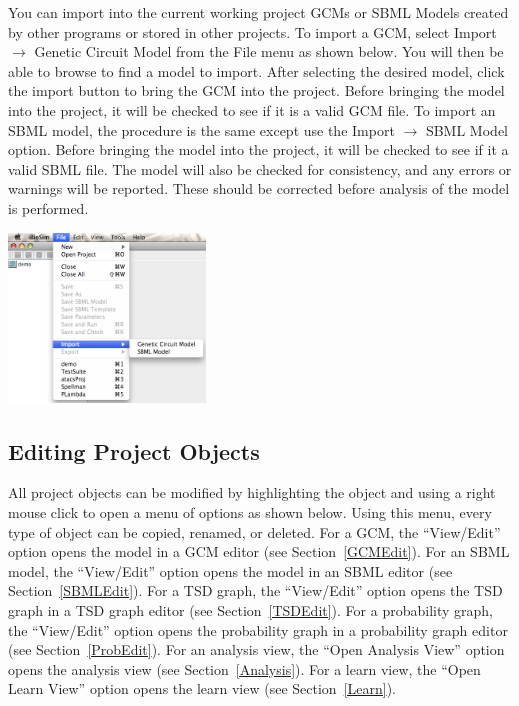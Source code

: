 \documentclass[titlepage,11pt]{article}
\begin{document}
\noindent
You can import into the current working project GCMs
or SBML Models created by other programs or stored in other projects. 
To import a GCM, select Import $\rightarrow$ Genetic Circuit Model
from the File menu as shown below. You will then be able to browse to
find a model to import.  After  selecting the desired model, click the 
import button
to bring the GCM into the project.  Before bringing the model into the 
project, it will be checked to see if it is a valid GCM file.
To import an SBML model, the procedure is the same except use the 
Import $\rightarrow$ SBML Model option.  Before bringing the model
into the project, it will be checked to see if it a valid SBML file.  
The model will also be checked for consistency, and any errors or
warnings will be reported.  These should be corrected before analysis 
of the model is performed.
\begin{center}
\includegraphics[height=45mm]{screenshots/import}
\end{center} 

\subsection{Editing Project Objects}

\noindent
All project objects can be modified by highlighting the object
and using a right mouse click to open a menu of options as shown
below. Using this menu, every type of object can be copied, renamed, or
deleted. For a GCM, the ``View/Edit'' option opens the
model in a GCM editor (see Section~\ref{GCMEdit}). For an SBML model,
the ``View/Edit'' option opens the model in an SBML editor 
(see Section~\ref{SBMLEdit}). For a TSD graph, the ``View/Edit'' 
option opens the TSD graph in a TSD graph editor (see Section~\ref{TSDEdit}). 
For a probability graph, the ``View/Edit'' option opens
the probability graph in a probability graph editor 
(see Section~\ref{ProbEdit}). 
For an analysis view, the ``Open Analysis View'' option opens the
analysis view (see Section~\ref{Analysis}). For a learn view, the
``Open Learn View'' option opens the learn view (see Section~\ref{Learn}).
\end{document}
